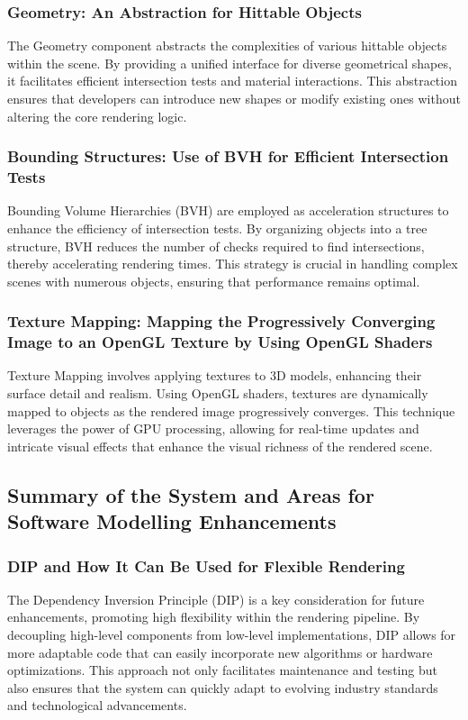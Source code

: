 \documentclass[12pt]{article}
\begin{document}
\subsubsection{Geometry: An Abstraction for Hittable Objects}
The Geometry component abstracts the complexities of various hittable objects within the scene. By providing a unified interface for diverse geometrical shapes, it facilitates efficient intersection tests and material interactions. This abstraction ensures that developers can introduce new shapes or modify existing ones without altering the core rendering logic.

\subsubsection{Bounding Structures: Use of BVH for Efficient Intersection Tests}
Bounding Volume Hierarchies (BVH) are employed as acceleration structures to enhance the efficiency of intersection tests. By organizing objects into a tree structure, BVH reduces the number of checks required to find intersections, thereby accelerating rendering times. This strategy is crucial in handling complex scenes with numerous objects, ensuring that performance remains optimal.

\subsubsection{Texture Mapping: Mapping the Progressively Converging Image to an OpenGL Texture by Using OpenGL Shaders}
Texture Mapping involves applying textures to 3D models, enhancing their surface detail and realism. Using OpenGL shaders, textures are dynamically mapped to objects as the rendered image progressively converges. This technique leverages the power of GPU processing, allowing for real-time updates and intricate visual effects that enhance the visual richness of the rendered scene.

\subsection{Summary of the System and Areas for Software Modelling Enhancements}

\subsubsection{DIP and How It Can Be Used for Flexible Rendering}
The Dependency Inversion Principle (DIP) is a key consideration for future enhancements, promoting high flexibility within the rendering pipeline. By decoupling high-level components from low-level implementations, DIP allows for more adaptable code that can easily incorporate new algorithms or hardware optimizations. This approach not only facilitates maintenance and testing but also ensures that the system can quickly adapt to evolving industry standards and technological advancements.
\end{document}
